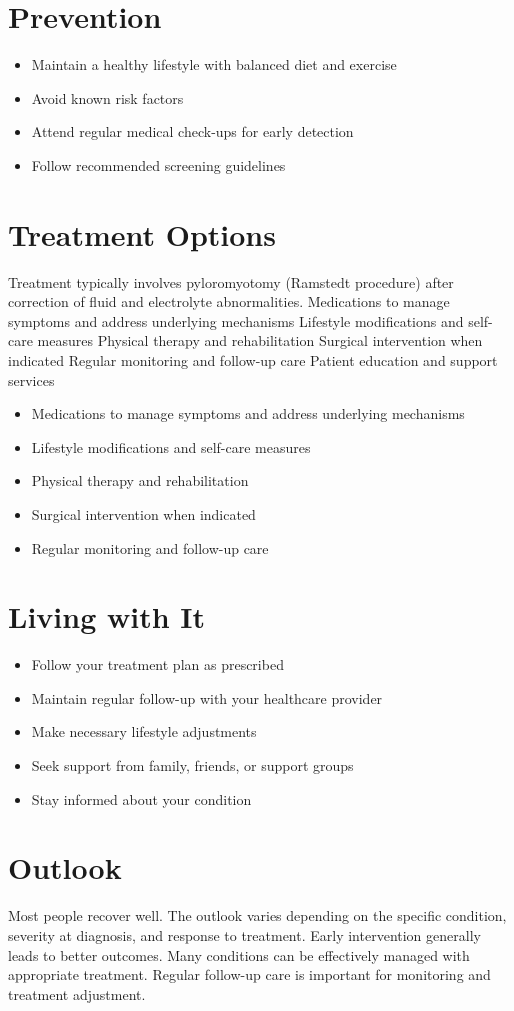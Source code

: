 \section{Prevention}
\begin{itemize}[noitemsep]
  \item Maintain a healthy lifestyle with balanced diet and exercise
  \item Avoid known risk factors
  \item Attend regular medical check-ups for early detection
  \item Follow recommended screening guidelines
\end{itemize}
\section{Treatment Options}
Treatment typically involves pyloromyotomy (Ramstedt procedure) after correction of fluid and electrolyte abnormalities. Medications to manage symptoms and address underlying mechanisms Lifestyle modifications and self-care measures Physical therapy and rehabilitation Surgical intervention when indicated Regular monitoring and follow-up care Patient education and support services

\begin{itemize}[noitemsep]
  \item Medications to manage symptoms and address underlying mechanisms
  \item Lifestyle modifications and self-care measures
  \item Physical therapy and rehabilitation
  \item Surgical intervention when indicated
  \item Regular monitoring and follow-up care
\end{itemize}
\section{Living with It}
\begin{itemize}[noitemsep]
  \item Follow your treatment plan as prescribed
  \item Maintain regular follow-up with your healthcare provider
  \item Make necessary lifestyle adjustments
  \item Seek support from family, friends, or support groups
  \item Stay informed about your condition
\end{itemize}
\section{Outlook}
Most people recover well. The outlook varies depending on the specific condition, severity at diagnosis, and response to treatment. Early intervention generally leads to better outcomes. Many conditions can be effectively managed with appropriate treatment. Regular follow-up care is important for monitoring and treatment adjustment.
